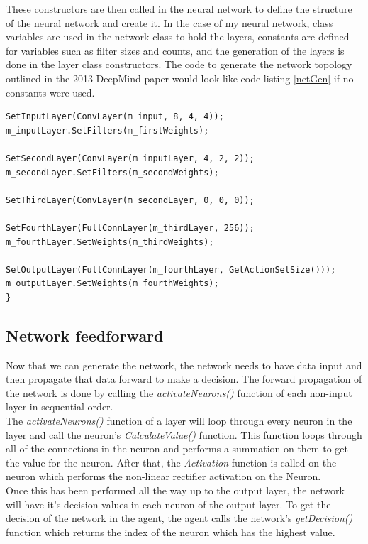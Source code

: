 \documentclass[10pt]{article}
\begin{document}
		These constructors are then called in the neural network to define the structure of the neural network and create it. In the case of my neural network, class variables are used in the network class to hold the layers, constants are defined for variables such as filter sizes and counts, and the generation of the layers is done in the layer class constructors. The code to generate the network topology outlined in the 2013 DeepMind paper would look like code listing \ref{netGen} if no constants were used.
				\renewcommand{\lstlistingname}{Code Listing}
		\begin{lstlisting}[caption={Network generation},label={netGen}]	
SetInputLayer(ConvLayer(m_input, 8, 4, 4));
m_inputLayer.SetFilters(m_firstWeights);

SetSecondLayer(ConvLayer(m_inputLayer, 4, 2, 2));
m_secondLayer.SetFilters(m_secondWeights);

SetThirdLayer(ConvLayer(m_secondLayer, 0, 0, 0));

SetFourthLayer(FullConnLayer(m_thirdLayer, 256));
m_fourthLayer.SetWeights(m_thirdWeights);

SetOutputLayer(FullConnLayer(m_fourthLayer, GetActionSetSize()));
m_outputLayer.SetWeights(m_fourthWeights);
}

		\end{lstlisting}

	\medskip
	
	\subsection{Network feedforward}
	Now that we can generate the network, the network needs to have data input and then propagate that data forward to make a decision. The forward propagation of the network is done by calling the \textit{activateNeurons()} function of each non-input layer in sequential order.\\
	
	 The \textit{activateNeurons()} function of a layer will loop through every neuron in the layer and call the neuron's \textit{CalculateValue()} function. This function loops through all of the connections in the neuron and performs a summation on them to get the value for the neuron. After that, the \textit{Activation} function is called on the neuron which performs the non-linear rectifier activation on the Neuron.\\
	
	Once this has been performed all the way up to the output layer, the network will have it's decision values in each neuron of the output layer. To get the decision of the network in the agent, the agent calls the network's \textit{getDecision()} function which returns the index of the neuron which has the highest value.
	\medskip
	
\end{document}
